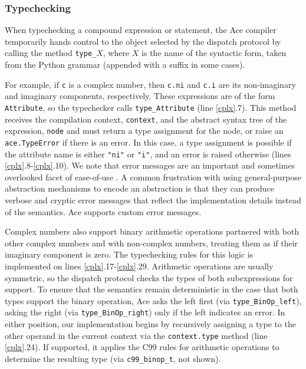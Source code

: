\documentclass[9pt,preprint]{sigplanconf}
\begin{document}
\subsubsection{Typechecking}
When typechecking a compound expression or statement, the Ace compiler temporarily hands control to the object selected by the dispatch protocol by calling the method \verb|type_|$X$, where $X$ is  the name of the syntactic form, taken from the Python grammar \cite{python} (appended with a suffix in some cases). 

For example, if \verb|c| is a complex number, then \verb|c.ni| and \verb|c.i| are its non-imaginary and imaginary components, respectively. These expressions are of the form \verb|Attribute|, so the typechecker calls \verb|type_Attribute| (line \ref{cplx}.7).
This method receives the compilation context, \verb|context|, and the abstract syntax tree of the expression, \verb|node| and must return a type assignment for the node, or raise an \verb|ace.TypeError| if there is an error. In this case, a type assignment is possible if the attribute name is either \verb|"ni"| or \verb|"i"|, and an error is raised otherwise (lines \ref{cplx}.8-\ref{cplx}.10). We note that error messages are an important and sometimes overlooked facet of {ease-of-use} \cite{marceau2011measuring}. A common frustration with using general-purpose abstraction mechanisms to encode an abstraction is that they can produce  verbose and cryptic error messages that reflect the implementation details instead of the semantics. Ace supports custom error messages.%

Complex numbers also support binary arithmetic operations partnered with both other complex numbers and with non-complex numbers, treating them as if their imaginary component is zero. The typechecking rules for this logic is implemented on lines \ref{cplx}.17-\ref{cplx}.29. Arithmetic operations are usually symmetric, so the dispatch protocol checks the types of both subexpressions for support. To ensure that the semantics remain deterministic in the case that both types support the binary operation, Ace asks the left first (via \verb|type_BinOp_left|), asking the right (via \verb|type_BinOp_right|) only if the left indicates an error. In either position, our implementation begins by recursively assigning a type to the other operand in the current context via the \verb|context.type| method (line \ref{cplx}.24). If supported, it applies the C99 rules for arithmetic operations to determine the resulting type (via \verb|c99_binop_t|, not shown). 
\end{document}
